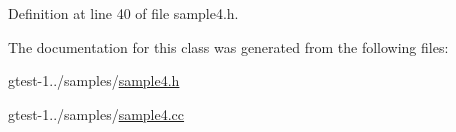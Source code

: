 \-Definition at line 40 of file sample4.\-h.



\-The documentation for this class was generated from the following files\-:\begin{DoxyCompactItemize}
\item 
gtest-\/1../samples/\hyperlink{sample4_8h}{sample4.\-h}\item 
gtest-\/1../samples/\hyperlink{sample4_8cc}{sample4.\-cc}\end{DoxyCompactItemize}
